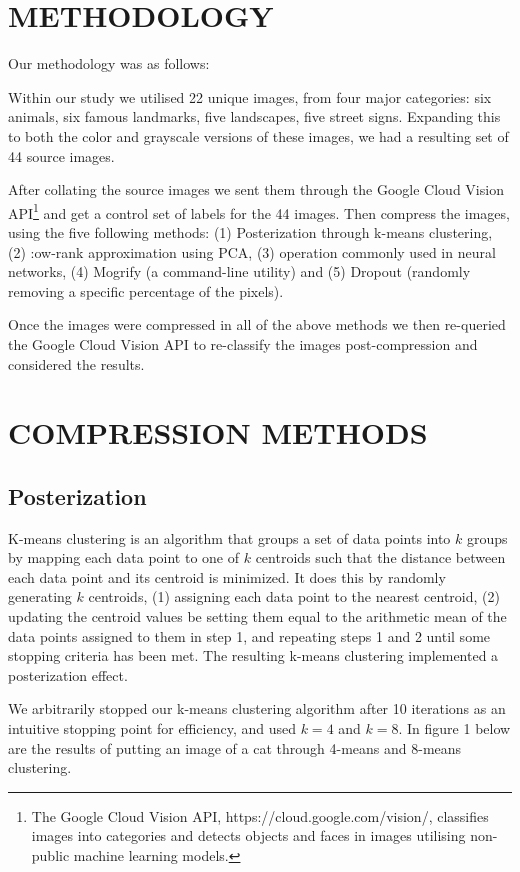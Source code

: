 \documentclass[letterpaper, 10 pt, conference]{ieeeconf}  %
\begin{document}
\section{METHODOLOGY}
Our methodology was as follows:

Within our study we utilised 22 unique images, from four major
categories: six animals, six famous landmarks, five landscapes, five
street signs. Expanding this to both the color and grayscale
versions of these images, we had a resulting set of 44 source images.

After collating the source images we sent them through the Google Cloud Vision API\footnote{The Google Cloud Vision API, https://cloud.google.com/vision/, classifies images into categories and detects objects and faces in images utilising non-public machine learning models.}
and get a control set of labels for the 44 images. Then compress the images, using the five following methods:
(1) Posterization through k-means clustering,
(2) :ow-rank approximation using PCA,
(3)  operation commonly used in neural networks,
(4) Mogrify (a command-line utility)
and (5) Dropout (randomly removing a specific percentage of the pixels).

Once the images were compressed in all of the above methods we then re-queried the Google Cloud Vision API to re-classify the images post-compression and considered the results.

\section{COMPRESSION METHODS}
\subsection{Posterization}
K-means clustering is an algorithm that groups
a set of data points into $k$ groups by mapping each data point
to one of $k$ centroids such that the distance between each data point
and its centroid is minimized. It does this by randomly generating $k$
centroids, (1) assigning each data point to the nearest centroid,
(2) updating the centroid values be setting them equal to the arithmetic
mean of the data points assigned to them in step 1, and repeating steps
1 and 2 until some stopping criteria has been met. The resulting k-means clustering implemented a posterization
effect.

We arbitrarily stopped our k-means clustering algorithm after 10 iterations as an intuitive stopping point for efficiency, and used $k=4$ and $k=8$. In figure 1 below are the results of putting an image of a cat through 4-means and 8-means
clustering.
\end{document}
